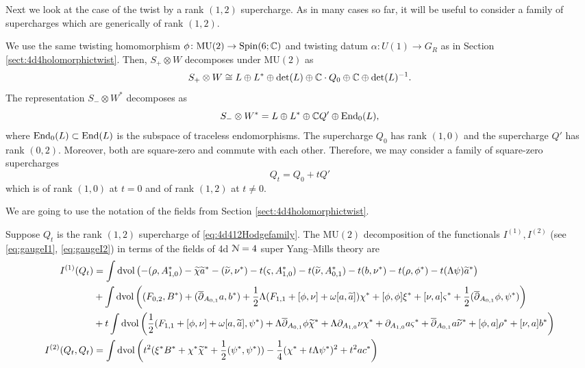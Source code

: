 \documentclass[10pt, oneside]{article}
\newcommand{\MU}{\mathrm{MU}}
\begin{document}
Next we look at the case of the twist by a rank $(1,2)$ supercharge. 
As in many cases so far, it will be useful to consider a family of supercharges which are generically of rank $(1,2)$. 

We use the same twisting homomorphism $\phi\colon \MU(2) \to \Spin(6;\CC)$ and twisting datum $\alpha\colon U(1) \to G_R$ as in Section \ref{sect:4d4holomorphictwist}.
Then, $S_+ \otimes W$ decomposes under $\MU(2)$ as
\[
S_+\otimes W\cong L\oplus L^*\oplus \det(L)\oplus \mathbb C \cdot Q_0 \oplus \mathbb C \oplus \det(L)^{-1}.
\]
The representation $S_- \otimes W^*$ decomposes as
\[
S_- \otimes W^* = L \oplus L^* \oplus \mathbb C Q'\oplus\operatorname{End}_0(L),
\]
where $\operatorname{End}_0(L)\subset \operatorname{End}(L)$ is the subspace of traceless endomorphisms. The supercharge $Q_0$ has rank $(1, 0)$ and the supercharge $Q'$ has rank $(0, 2)$. Moreover, both are square-zero and commute with each other. Therefore, we may consider a family of square-zero supercharges
\begin{equation}
Q_t = Q_0 + tQ'
\label{eq:4d412Hodgefamily}
\end{equation}
which is of rank $(1, 0)$ at $t=0$ and of rank $(1, 2)$ at $t\neq 0$.

We are going to use the notation of the fields from Section \ref{sect:4d4holomorphictwist}.

\begin{prop}
Suppose $Q_t$ is the rank $(1,2)$ supercharge of \eqref{eq:4d412Hodgefamily}. The $\MU(2)$ decomposition of the functionals $I^{(1)}, I^{(2)}$ (see \eqref{eq:gaugeI1}, \eqref{eq:gaugeI2}) in terms of the fields of 4d $\mathcal N=4$ super Yang--Mills theory are
\begin{align*}
I^{(1)}(Q_t) &= \int \operatorname{dvol}\left(-(\rho, A_{1, 0}^*) - \widetilde{\chi}\widetilde{a}^* - (\widetilde{\nu}, \nu^*) - t(\varsigma, A_{1, 0}^*) - t(\widetilde{\nu}, A_{0, 1}^*) - t(b, \nu^*) - t(\rho, \phi^*) - t(\Lambda\psi)\widetilde{a}^*\right) \\
&+ \int\operatorname{dvol}\left((F_{0, 2}, B^*) + (\overline{\partial}_{A_{0, 1}}a, b^*) + \frac{1}{2}\Lambda(F_{1, 1} + [\phi, \nu] + \omega [a, \widetilde{a}])\chi^* + [\phi, \phi]\xi^* + [\nu, a]\varsigma^* + \frac{1}{2} (\overline{\partial}_{A_{0,1}} \phi, \psi^*)\right) \\
&+t\int\operatorname{dvol}\left(\frac{1}{2} (F_{1, 1} + [\phi, \nu] + \omega [a, \widetilde{a}], \psi^*) + \Lambda \overline{\partial}_{A_{0, 1}} \phi \widetilde{\chi}^* + \Lambda \partial_{A_{1, 0}}\nu \chi^* + \partial_{A_{1, 0}} a \varsigma^* + \overline{\partial}_{A_{0, 1}} a \widetilde{\nu}^* + [\phi, a]\rho^* + [\nu, a]b^*\right) \\
I^{(2)} (Q_t, Q_t) &= \int \operatorname{dvol} \left(t^2(\xi^*B^* + \chi^*\widetilde{\chi}^* + \frac{1}{2}(\psi^*, \psi^*)) -\frac{1}{4}(\chi^* + t \Lambda\psi^*)^2 + t^2 ac^*\right) \\
\end{align*}
\end{prop}
\end{document}
